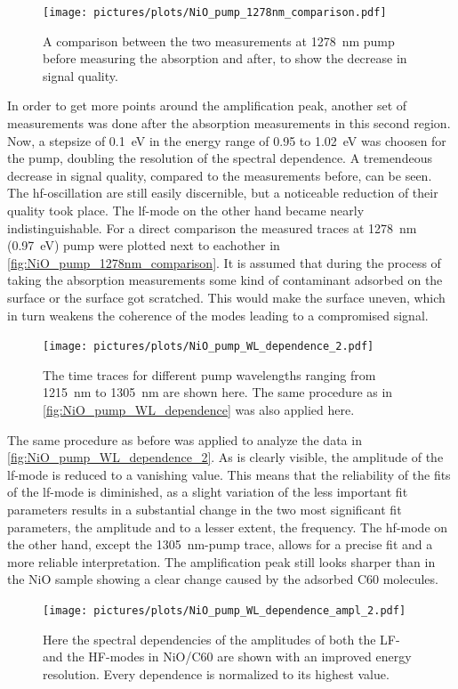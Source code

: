 \begin{figure}[ht]
    \centering
    \texttt{[image: pictures/plots/NiO\_pump\_1278nm\_comparison.pdf]}
    \caption{A comparison between the two measurements at \qty{1278}{nm} pump before measuring the absorption and after, to show the decrease in signal quality.}
    \label{fig:NiO_pump_1278nm_comparison}
\end{figure}
In order to get more points around the amplification peak, another set of measurements was done after the absorption measurements in this second region.
Now, a stepsize of \qty{0.1}{eV} in the energy range of 0.95 to \qty{1.02}{eV} was choosen for the pump, doubling the resolution of the spectral dependence.
A tremendeous decrease in signal quality, compared to the measurements before, can be seen.
The hf-oscillation are still easily discernible, but a noticeable reduction of their quality took place.
The lf-mode on the other hand became nearly indistinguishable.
For a direct comparison the measured traces at \qty{1278}{nm} (\qty{0.97}{eV}) pump were plotted next to eachother in \autoref{fig:NiO_pump_1278nm_comparison}.
It is assumed that during the process of taking the absorption measurements some kind of contaminant adsorbed on the surface or the surface got scratched.
This would make the surface uneven, which in turn weakens the coherence of the modes leading to a compromised signal.
\begin{figure}[ht]
    \centering
    \texttt{[image: pictures/plots/NiO\_pump\_WL\_dependence\_2.pdf]}
    \caption{The time traces for different pump wavelengths ranging from \qty{1215}{nm} to \qty{1305}{nm} are shown here. The same procedure as in \autoref{fig:NiO_pump_WL_dependence} was also applied here.}
    \label{fig:NiO_pump_WL_dependence_2}
\end{figure}

The same procedure as before was applied to analyze the data in \autoref{fig:NiO_pump_WL_dependence_2}.
As is clearly visible, the amplitude of the lf-mode is reduced to a vanishing value.
This means that the reliability of the fits of the lf-mode is diminished, as a slight variation of the less important fit parameters results in a substantial change in the two most significant fit parameters, the amplitude and to a lesser extent, the frequency.
The hf-mode on the other hand, except the \qty{1305}{nm}-pump trace, allows for a precise fit and a more reliable interpretation.
The amplification peak still looks sharper than in the NiO sample showing a clear change caused by the adsorbed C60 molecules.
\begin{figure}[ht]
    \centering
    \texttt{[image: pictures/plots/NiO\_pump\_WL\_dependence\_ampl\_2.pdf]}
    \caption{Here the spectral dependencies of the amplitudes of both the LF- and the HF-modes in NiO/C60 are shown with an improved energy resolution. Every dependence is normalized to its highest value.}
    \label{fig:NiO_pump_WL_dependence_ampl_2}
\end{figure}
\FloatBarrier

